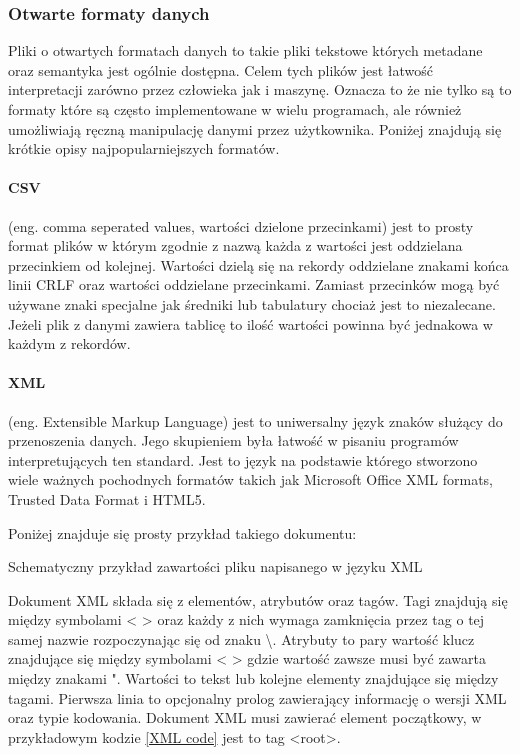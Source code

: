\subsubsection{Otwarte formaty danych}

Pliki o otwartych formatach danych to takie pliki tekstowe których metadane oraz semantyka jest ogólnie dostępna. 
Celem tych plików jest łatwość interpretacji zarówno przez człowieka jak i maszynę. 
Oznacza to że nie tylko są to formaty które są często implementowane w wielu programach, ale również umożliwiają ręczną manipulację danymi przez użytkownika.  
Poniżej znajdują się krótkie opisy najpopularniejszych formatów.

\paragraph{CSV}
(eng. comma seperated values, wartości dzielone przecinkami) jest to prosty format plików w którym zgodnie z nazwą każda z wartości jest oddzielana przecinkiem od kolejnej. Wartości dzielą się na rekordy oddzielane znakami końca linii CRLF oraz wartości oddzielane przecinkami. Zamiast przecinków mogą być używane znaki specjalne jak średniki lub tabulatury chociaż jest to niezalecane. Jeżeli plik z danymi zawiera tablicę to ilość wartości powinna być jednakowa w każdym z rekordów. 

\paragraph{XML}
(eng. Extensible Markup Language) jest to uniwersalny język znaków służący do przenoszenia danych. Jego skupieniem była łatwość w pisaniu programów interpretujących ten standard.
Jest to język na podstawie którego stworzono wiele ważnych pochodnych formatów takich jak Microsoft Office XML formats, Trusted Data Format i HTML5.

Poniżej znajduje się prosty przykład takiego dokumentu:
\begin{kod}
        
        \caption{Schematyczny przykład zawartości pliku napisanego w języku XML}
        \label{XML code}
\end{kod}

Dokument XML składa się z elementów, atrybutów oraz tagów. 
Tagi znajdują się między symbolami < > oraz każdy z nich wymaga zamknięcia przez tag o tej samej nazwie rozpoczynając się od znaku \textbackslash.
Atrybuty to pary wartość klucz znajdujące się między symbolami < > gdzie wartość zawsze musi być zawarta między znakami ".
Wartości to tekst lub kolejne elementy znajdujące się między tagami. 
Pierwsza linia to opcjonalny prolog zawierający informację o wersji XML oraz typie kodowania.  
Dokument XML musi zawierać element początkowy, w przykładowym kodzie \ref{XML code} jest to tag <root>.

